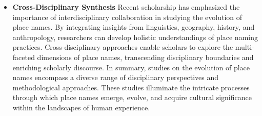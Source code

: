 \begin{itemize}
	\item \textbf{Cross-Disciplinary Synthesis}
Recent scholarship has emphasized the importance of interdisciplinary collaboration in studying the evolution of place names. By integrating insights from linguistics, geography, history, and anthropology, researchers can develop holistic understandings of place naming practices\cite{Bolstad}. Cross-disciplinary approaches enable scholars to explore the multi-faceted dimensions of place names, transcending disciplinary boundaries and enriching scholarly discourse.
In summary, studies on the evolution of place names encompass a diverse range of disciplinary perspectives and methodological approaches. These studies illuminate the intricate processes through which place names emerge, evolve, and acquire cultural significance within the landscapes of human experience.
\end{itemize}

